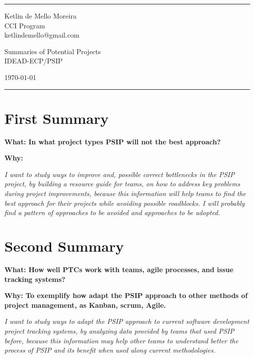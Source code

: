 \documentclass[a4paper]{article}
\begin{document}

\fancyhead[C]{}
\hrule \medskip %
\begin{minipage}{0.295\textwidth} 
\raggedright
\footnotesize
Ketlin de Mello Moreira \hfill\\   
CCI Program\hfill\\
ketlindemello@gmail.com
\end{minipage}
\begin{minipage}{0.4\textwidth} 
\centering 
\large 
Summaries of Potential Projects\\ 
\normalsize 
IDEAD-ECP/PSIP\\ 
\end{minipage}
\begin{minipage}{0.295\textwidth} 
\raggedleft
\today\hfill\\
\end{minipage}
\medskip\hrule 
\bigskip


\section{First Summary}
\textbf {What: In what project types PSIP will not the best approach?} \par
\textbf {Why: } \par
\textit{I want to study ways to improve and, possible correct bottlenecks in the PSIP project, by building a resource guide for teams, on how to address key problems during project improvements, because this information will help teams to find the best approach for their projects while avoiding possible roadblocks. I will probably find a pattern of approaches to be avoided and approaches to be adopted.}


\section{Second Summary}
\textbf {What: How well PTCs work with teams, agile processes, and issue tracking systems?} \par
\textbf {Why: To exemplify how  adapt the PSIP approach to other methods of project management, as Kanban, scrum, Agile.} \par
\textit{I want to study ways to adapt the PSIP approach to current software development project tracking systems, by analyzing data provided by teams that used PSIP before, because this information may help other teams to understand better the process of PSIP and its benefit when used along current methodologies.}
\end{document}
